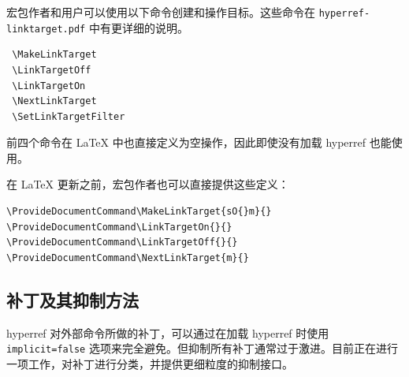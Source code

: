\documentclass{article}
\newcommand*{\xpackage}[1]{\textsf{#1}}
\begin{document}
宏包作者和用户可以使用以下命令创建和操作目标。这些命令在 \texttt{hyperref-linktarget.pdf} 中有更详细的说明。

\begin{verbatim}
 \MakeLinkTarget
 \LinkTargetOff
 \LinkTargetOn
 \NextLinkTarget
 \SetLinkTargetFilter
\end{verbatim}

前四个命令在 \LaTeX{} 中也直接定义为空操作，因此即使没有加载 \xpackage{hyperref} 也能使用。

在 \LaTeX{} 更新之前，宏包作者也可以直接提供这些定义：

\begin{verbatim}
\ProvideDocumentCommand\MakeLinkTarget{sO{}m}{}
\ProvideDocumentCommand\LinkTargetOn{}{}
\ProvideDocumentCommand\LinkTargetOff{}{}
\ProvideDocumentCommand\NextLinkTarget{m}{}
\end{verbatim}

\subsection{补丁及其抑制方法}

\xpackage{hyperref} 对外部命令所做的补丁，可以通过在加载
\xpackage{hyperref} 时使用 \texttt{implicit=false} 选项来完全避免。但抑制所有补丁通常过于激进。目前正在进行一项工作，对补丁进行分类，并提供更细粒度的抑制接口。
\end{document}
